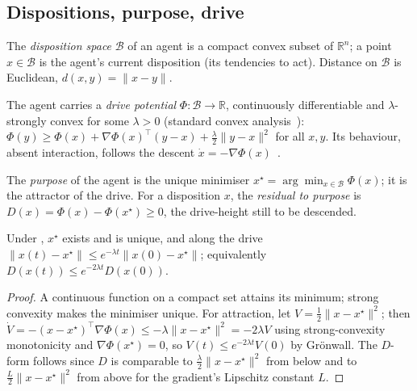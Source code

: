 \documentclass[11pt,twocolumn,a4paper]{article}
\newcommand{\R}{\mathbb{R}}
\newcommand{\Beh}{\mathcal{B}}       %
\newcommand{\Purp}{x^{\star}}        %
\newcommand{\drive}{\Phi}            %
\newcommand{\lam}{\lambda}
\newcommand{\norm}[1]{\lVert#1\rVert}
\newcommand{\dist}{d}
\begin{document}
\subsection{Dispositions, purpose, drive}

\begin{definition}
\label{def:disp}
The \emph{disposition space} $\Beh$ of an agent is a compact convex subset
of $\R^n$; a point $x\in\Beh$ is the agent's current disposition (its
tendencies to act). Distance on $\Beh$ is Euclidean, $\dist(x,y)=
\norm{x-y}$.
\end{definition}

\begin{axiom}
\label{ax:drive}
The agent carries a \emph{drive potential} $\drive:\Beh\to\R$,
continuously differentiable and $\lam$-strongly convex for some $\lam>0$
(standard convex analysis~\cite{rockafellar1970,boydvandenberghe2004,%
nesterov2018}):
$\drive(y)\ge\drive(x)+\nabla\drive(x)^\top(y-x)+\tfrac{\lam}{2}
\norm{y-x}^2$ for all $x,y$. Its behaviour, absent interaction, follows
the descent $\dot x=-\nabla\drive(x)$~\cite{khalil2002,%
hirschsmaledevaney2013}.
\end{axiom}

\begin{definition}[Purpose]
\label{def:purpose}
The \emph{purpose} of the agent is the unique minimiser
$\Purp=\arg\min_{x\in\Beh}\drive(x)$; it is the attractor of the drive.
For a disposition $x$, the \emph{residual to purpose} is
$D(x)=\drive(x)-\drive(\Purp)\ge0$, the drive-height still to be
descended.
\end{definition}

\begin{lemma}
\label{lem:purpose}
Under , $\Purp$ exists and is unique, and along the drive
$\norm{x(t)-\Purp}\le e^{-\lam t}\norm{x(0)-\Purp}$; equivalently
$D(x(t))\le e^{-2\lam t}D(x(0))$.
\end{lemma}

\begin{proof}
A continuous function on a compact set attains its minimum; strong
convexity makes the minimiser unique. For attraction, let
$V=\tfrac12\norm{x-\Purp}^2$; then $\dot V=-(x-\Purp)^\top\nabla\drive(x)
\le-\lam\norm{x-\Purp}^2=-2\lam V$ using strong-convexity monotonicity and
$\nabla\drive(\Purp)=0$, so $V(t)\le e^{-2\lam t}V(0)$ by Grönwall. The
$D$-form follows since $D$ is comparable to $\tfrac{\lam}{2}\norm{x-\Purp}^2$
from below and to $\tfrac{L}{2}\norm{x-\Purp}^2$ from above for the
gradient's Lipschitz constant $L$.
\end{proof}
\end{document}

